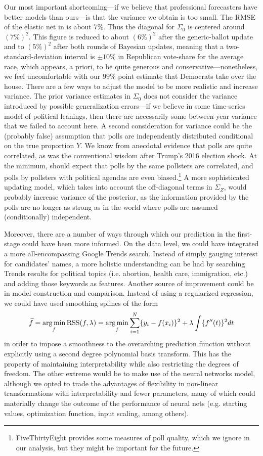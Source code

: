 \documentclass[12pt, letterpaper]{article}
\begin{document}
Our most important shortcoming---if we believe that professional forecasters have better models than ours---is that the variance we obtain is too small. The RMSE of the elastic net in  is about 7\%. Thus the diagonal for $\Sigma_0$ is centered around $(7\%)^2$. This figure is reduced to about $(6\%)^2$ after the generic-ballot update and to $(5\%)^2$ after both rounds of Bayesian updates, meaning that a two-standard-deviation interval is $\pm 10\%$ in Republican vote-share for the average race, which appears, a priori, to be quite generous and conservative---nonetheless, we feel uncomfortable with our $99\%$ point estimate that Democrats take over the house. There are a few ways to adjust the model to be more realistic and increase variance. The prior variance estimates in $\Sigma_0$ does not consider the variance introduced by possible generalization errors---if we believe in some time-series model of political leanings, then there are necessarily some between-year variance that we failed to account here. A second consideration for variance could be the (probably false) assumption that polls are independently distributed conditional on the true proportion $Y$. We know from anecdotal evidence that polls are quite correlated, as was the conventional wisdom after Trump's 2016 election shock. At the minimum, should expect that polls by the same pollsters are correlated, and polls by pollsters with political agendas are even biased.\footnote{FiveThirtyEight provides some measures of poll quality, which we ignore in our analysis, but they might be important for the future.} A  
 more sophisticated updating model, which takes into account the off-diagonal terms in $\Sigma_Z$, would probably increase variance of the posterior, as the information provided by the polls are no longer as strong as in the world where polls are assumed (conditionally) independent.

Moreover, there are a number of ways through which our prediction in the first-stage could have been more informed. On the data level, we could have integrated a more all-encompassing Google Trends search. Instead of simply gauging interest for candidates' names, a more holistic understanding can be had by searching Trends results for political topics (i.e. abortion, health care, immigration, etc.) and adding those keywords as features. Another source of improvement could be in model construction and comparison. Instead of using a regularized regression, we could have used smoothing splines of the form $$
\widehat f = \operatorname*{arg\,min}_f 
\mathrm{RSS}(f, \lambda) = \operatorname*{arg\,min}_f \sum_{i=1}^{N}\{y_i - f(x_i)\}^2 + \lambda \int \{f''(t)\}^2dt$$ in order to impose a smoothness to the overarching prediction function without explicitly using a second degree polynomial basis transform. This has the property of maintaining interpretability while also restricting the degrees of freedom. The other extreme would be to make use of the neural networks model, although we opted to trade the advantages of flexibility in non-linear transformations with interpretability and fewer parameters, many of which could materially change the outcome of the performance of neural nets (e.g. starting values, optimization function, input scaling, among others).
\end{document}
